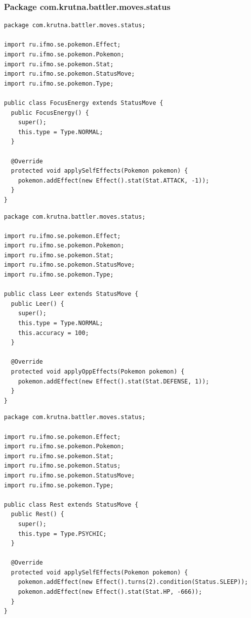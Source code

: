 \documentclass[11pt]{article}
\begin{document}
\subsubsection{Package com.krutna.battler.moves.status}
\label{sec:org59cfdf5}
\begin{lstlisting}
package com.krutna.battler.moves.status;

import ru.ifmo.se.pokemon.Effect;
import ru.ifmo.se.pokemon.Pokemon;
import ru.ifmo.se.pokemon.Stat;
import ru.ifmo.se.pokemon.StatusMove;
import ru.ifmo.se.pokemon.Type;

public class FocusEnergy extends StatusMove {
  public FocusEnergy() {
    super();
    this.type = Type.NORMAL;
  }

  @Override
  protected void applySelfEffects(Pokemon pokemon) {
    pokemon.addEffect(new Effect().stat(Stat.ATTACK, -1));
  }
}
\end{lstlisting}
\begin{lstlisting}
package com.krutna.battler.moves.status;

import ru.ifmo.se.pokemon.Effect;
import ru.ifmo.se.pokemon.Pokemon;
import ru.ifmo.se.pokemon.Stat;
import ru.ifmo.se.pokemon.StatusMove;
import ru.ifmo.se.pokemon.Type;

public class Leer extends StatusMove {
  public Leer() {
    super();
    this.type = Type.NORMAL;
    this.accuracy = 100;
  }

  @Override
  protected void applyOppEffects(Pokemon pokemon) {
    pokemon.addEffect(new Effect().stat(Stat.DEFENSE, 1));
  }
}
\end{lstlisting}
\begin{lstlisting}
package com.krutna.battler.moves.status;

import ru.ifmo.se.pokemon.Effect;
import ru.ifmo.se.pokemon.Pokemon;
import ru.ifmo.se.pokemon.Stat;
import ru.ifmo.se.pokemon.Status;
import ru.ifmo.se.pokemon.StatusMove;
import ru.ifmo.se.pokemon.Type;

public class Rest extends StatusMove {
  public Rest() {
    super();
    this.type = Type.PSYCHIC;
  }

  @Override
  protected void applySelfEffects(Pokemon pokemon) {
    pokemon.addEffect(new Effect().turns(2).condition(Status.SLEEP));
    pokemon.addEffect(new Effect().stat(Stat.HP, -666));
  }
}
\end{lstlisting}
\end{document}
